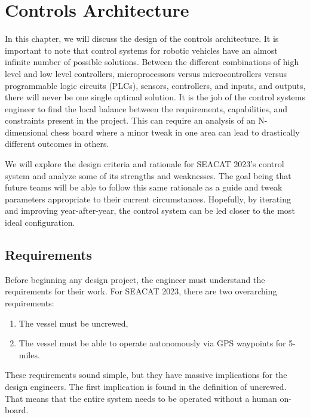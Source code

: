 %

\chapter{Controls Architecture}
\setchapterpreamble[u]{\margintoc}

In this chapter, we will discuss the design of the controls architecture.
It is important to note that control systems for robotic vehicles have an almost infinite number of possible solutions.
Between the different combinations of high level and low level controllers, microprocessors versus microcontrollers versus programmable logic circuits (PLCs), sensors, controllers, and inputs, and outputs, there will never be one single optimal solution.
It is the job of the control systems engineer to find the local balance between the requirements, capabilities, and constraints present in the project.
This can require an analysis of an N-dimensional chess board where a minor tweak in one area can lead to drastically different outcomes in others.

We will explore the design criteria and rationale for SEACAT 2023's control system and analyze some of its strengths and weaknesses.
The goal being that future teams will be able to follow this same rationale as a guide and tweak parameters appropriate to their current circumstances.
Hopefully, by iterating and improving year-after-year, the control system can be led closer to the most ideal configuration.

\section{Requirements}
Before beginning any design project, the engineer must understand the requirements for their work.
For SEACAT 2023, there are two overarching requirements:

\begin{enumerate}
    \item The vessel must be uncrewed,
    \item The vessel must be able to operate autonomously via GPS waypoints for 5-miles.
\end{enumerate}

These requirements sound simple, but they have massive implications for the design engineers.
The first implication is found in the definition of uncrewed.
That means that the entire system needs to be operated without a human on-board.

